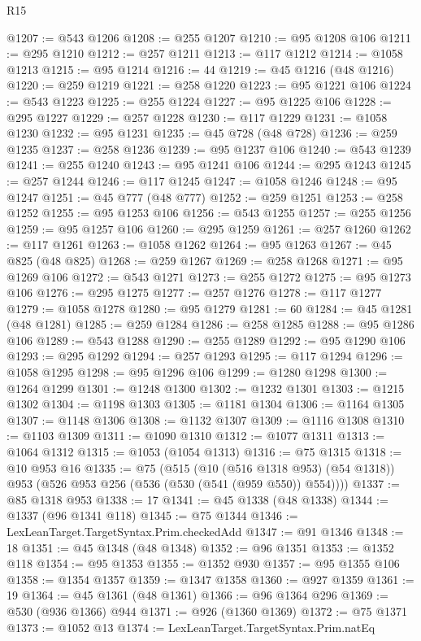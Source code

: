 \begin{lexlean}{R15}
\begin{coremodule}
{{{{{{{{{{{{{{{{{{{{{{{{{{{{{{{{{{{{{{{{{{{{{{{{{{{{{{{{{{{{{{{{{{{{{{@1207 := @543 @1206
@1208 := @255 @1207
@1210 := @95 @1208 @106
@1211 := @295 @1210
@1212 := @257 @1211
@1213 := @117 @1212
@1214 := @1058 @1213
@1215 := @95 @1214
@1216 := 44
@1219 := @45 @1216 (@48 @1216)
@1220 := @259 @1219
@1221 := @258 @1220
@1223 := @95 @1221 @106
@1224 := @543 @1223
@1225 := @255 @1224
@1227 := @95 @1225 @106
@1228 := @295 @1227
@1229 := @257 @1228
@1230 := @117 @1229
@1231 := @1058 @1230
@1232 := @95 @1231
@1235 := @45 @728 (@48 @728)
@1236 := @259 @1235
@1237 := @258 @1236
@1239 := @95 @1237 @106
@1240 := @543 @1239
@1241 := @255 @1240
@1243 := @95 @1241 @106
@1244 := @295 @1243
@1245 := @257 @1244
@1246 := @117 @1245
@1247 := @1058 @1246
@1248 := @95 @1247
@1251 := @45 @777 (@48 @777)
@1252 := @259 @1251
@1253 := @258 @1252
@1255 := @95 @1253 @106
@1256 := @543 @1255
@1257 := @255 @1256
@1259 := @95 @1257 @106
@1260 := @295 @1259
@1261 := @257 @1260
@1262 := @117 @1261
@1263 := @1058 @1262
@1264 := @95 @1263
@1267 := @45 @825 (@48 @825)
@1268 := @259 @1267
@1269 := @258 @1268
@1271 := @95 @1269 @106
@1272 := @543 @1271
@1273 := @255 @1272
@1275 := @95 @1273 @106
@1276 := @295 @1275
@1277 := @257 @1276
@1278 := @117 @1277
@1279 := @1058 @1278
@1280 := @95 @1279
@1281 := 60
@1284 := @45 @1281 (@48 @1281)
@1285 := @259 @1284
@1286 := @258 @1285
@1288 := @95 @1286 @106
@1289 := @543 @1288
@1290 := @255 @1289
@1292 := @95 @1290 @106
@1293 := @295 @1292
@1294 := @257 @1293
@1295 := @117 @1294
@1296 := @1058 @1295
@1298 := @95 @1296 @106
@1299 := @1280 @1298
@1300 := @1264 @1299
@1301 := @1248 @1300
@1302 := @1232 @1301
@1303 := @1215 @1302
@1304 := @1198 @1303
@1305 := @1181 @1304
@1306 := @1164 @1305
@1307 := @1148 @1306
@1308 := @1132 @1307
@1309 := @1116 @1308
@1310 := @1103 @1309
@1311 := @1090 @1310
@1312 := @1077 @1311
@1313 := @1064 @1312
@1315 := @1053 (@1054 @1313)
@1316 := @75 @1315
@1318 := @10 @953 @16
@1335 := @75
    (@515
      (@10 (@516 @1318 @953) (@54 @1318))
      @953
      (@526 @953 @256 (@536 (@530 (@541 (@959 @550)) @554))))
@1337 := @85 @1318 @953
@1338 := 17
@1341 := @45 @1338 (@48 @1338)
@1344 := @1337 (@96 @1341 @118)
@1345 := @75 @1344
@1346 := LexLeanTarget.TargetSyntax.Prim.checkedAdd
@1347 := @91 @1346
@1348 := 18
@1351 := @45 @1348 (@48 @1348)
@1352 := @96 @1351
@1353 := @1352 @118
@1354 := @95 @1353
@1355 := @1352 @930
@1357 := @95 @1355 @106
@1358 := @1354 @1357
@1359 := @1347 @1358
@1360 := @927 @1359
@1361 := 19
@1364 := @45 @1361 (@48 @1361)
@1366 := @96 @1364 @296
@1369 := @530 (@936 @1366) @944
@1371 := @926 (@1360 @1369)
@1372 := @75 @1371
@1373 := @1052 @13
@1374 := LexLeanTarget.TargetSyntax.Prim.natEq
}}}}}}}}}}}}}}}}}}}}}}}}}}}}}}}}}}}}}}}}}}}}}}}}}}}}}}}}}}}}}}}}}}}}}}
\end{coremodule}
\end{lexlean}

